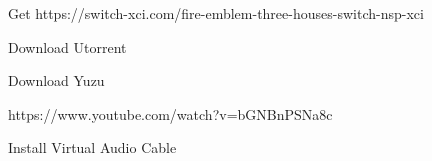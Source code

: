 
Get https://switch-xci.com/fire-emblem-three-houses-switch-nsp-xci

Download Utorrent

Download Yuzu

https://www.youtube.com/watch?v=bGNBnPSNa8c

Install Virtual Audio Cable